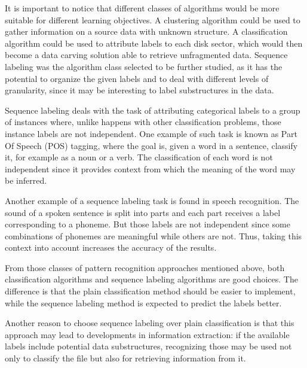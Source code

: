 It is important to notice that different classes of algorithms would be more suitable for different learning objectives.
A clustering algorithm could be used to gather information on a source data with unknown structure.
A classification algorithm could be used to attribute labels to each disk sector, which would then become a data carving solution able to retrieve unfragmented data.
Sequence labeling was the algorithm class selected to be further studied, as it has the potential to organize the given labels and to deal with different levels of granularity, since it may be interesting to label substructures in the data.

Sequence labeling deals with the task of attributing categorical labels to a group of instances where, unlike happens with other classification problems, those instance labels are not independent.
One example of such task is known as Part Of Speech (POS) tagging, where the goal is, given a word in a sentence, classify it, for example as a noun or a verb.
The classification of each word is not independent since it provides context from which the meaning of the word may be inferred.

Another example of a sequence labeling task is found in speech recognition.
The sound of a spoken sentence is split into parts and each part receives a label corresponding to a phoneme. But those labels are not independent since some combinations of phonemes are meaningful while others are not. Thus, taking this context into account increases the accuracy of the results.

From those classes of pattern recognition approaches mentioned above, both classification algorithms and sequence labeling algorithms are good choices.
The difference is that the plain classification method should be easier to implement, while the sequence labeling method is expected to predict the labels better.

Another reason to choose sequence labeling over plain classification is that this approach may lead to developments in information extraction: if the available labels include potential data substructures, recognizing those may be used not only to classify the file but also for retrieving information from it.
